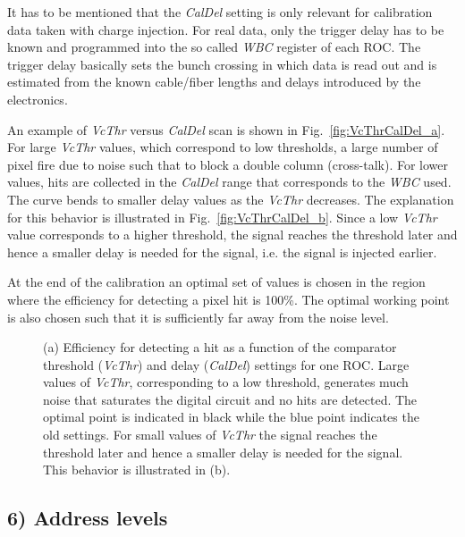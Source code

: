 It has to be mentioned that the \textit{CalDel} setting is only relevant for calibration data taken with charge injection.
For real data, only the trigger delay has to be known and programmed into the so called \textit{WBC} register of each ROC.
The trigger delay basically sets the bunch crossing in which data is read out and is estimated from the known cable/fiber lengths and delays introduced by the electronics.

An example of \textit{VcThr} versus \textit{CalDel} scan is shown in Fig.~\ref{fig:VcThrCalDel_a}.
For large \textit{VcThr} values, which correspond to low thresholds, a large number of pixel fire due to noise such that to block a double column (cross-talk).
For lower values, hits are collected in the \textit{CalDel} range that corresponds to the \textit{WBC} used.
The curve bends to smaller delay values as the \textit{VcThr} decreases. The explanation for this behavior is illustrated in Fig.~\ref{fig:VcThrCalDel_b}.
Since a low \textit{VcThr} value corresponds to a higher threshold, the signal reaches the threshold later and hence a smaller delay is needed for the signal, i.e. the signal is injected earlier.

At the end of the calibration an optimal set of values is chosen in the region where the efficiency for detecting a pixel hit is 100\%.
The optimal working point is also chosen such that it is sufficiently far away from the noise level.

\begin{figure}[!htb]
 \begin{center}
 \end{center}
 \caption{(a) Efficiency for detecting a hit as a function of the comparator threshold (\textit{VcThr}) and delay (\textit{CalDel}) settings for one ROC. Large values of \textit{VcThr}, corresponding to a low threshold, generates much noise that saturates the digital circuit and no hits are detected. The optimal point is indicated in black while the blue point indicates the old settings. For small values of \textit{VcThr} the signal reaches the threshold later and hence a smaller delay is needed for the signal. This behavior is illustrated in (b).}
 \label{fig:VcThrCalDel}
\end{figure}

\subsection*{6) Address levels}

